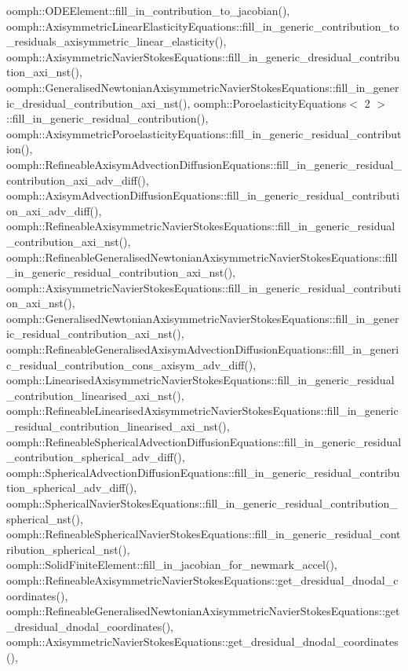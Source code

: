 oomph\+::\+O\+D\+E\+Element\+::fill\+\_\+in\+\_\+contribution\+\_\+to\+\_\+jacobian(), oomph\+::\+Axisymmetric\+Linear\+Elasticity\+Equations\+::fill\+\_\+in\+\_\+generic\+\_\+contribution\+\_\+to\+\_\+residuals\+\_\+axisymmetric\+\_\+linear\+\_\+elasticity(), oomph\+::\+Axisymmetric\+Navier\+Stokes\+Equations\+::fill\+\_\+in\+\_\+generic\+\_\+dresidual\+\_\+contribution\+\_\+axi\+\_\+nst(), oomph\+::\+Generalised\+Newtonian\+Axisymmetric\+Navier\+Stokes\+Equations\+::fill\+\_\+in\+\_\+generic\+\_\+dresidual\+\_\+contribution\+\_\+axi\+\_\+nst(), oomph\+::\+Poroelasticity\+Equations$<$ 2 $>$\+::fill\+\_\+in\+\_\+generic\+\_\+residual\+\_\+contribution(), oomph\+::\+Axisymmetric\+Poroelasticity\+Equations\+::fill\+\_\+in\+\_\+generic\+\_\+residual\+\_\+contribution(), oomph\+::\+Refineable\+Axisym\+Advection\+Diffusion\+Equations\+::fill\+\_\+in\+\_\+generic\+\_\+residual\+\_\+contribution\+\_\+axi\+\_\+adv\+\_\+diff(), oomph\+::\+Axisym\+Advection\+Diffusion\+Equations\+::fill\+\_\+in\+\_\+generic\+\_\+residual\+\_\+contribution\+\_\+axi\+\_\+adv\+\_\+diff(), oomph\+::\+Refineable\+Axisymmetric\+Navier\+Stokes\+Equations\+::fill\+\_\+in\+\_\+generic\+\_\+residual\+\_\+contribution\+\_\+axi\+\_\+nst(), oomph\+::\+Refineable\+Generalised\+Newtonian\+Axisymmetric\+Navier\+Stokes\+Equations\+::fill\+\_\+in\+\_\+generic\+\_\+residual\+\_\+contribution\+\_\+axi\+\_\+nst(), oomph\+::\+Axisymmetric\+Navier\+Stokes\+Equations\+::fill\+\_\+in\+\_\+generic\+\_\+residual\+\_\+contribution\+\_\+axi\+\_\+nst(), oomph\+::\+Generalised\+Newtonian\+Axisymmetric\+Navier\+Stokes\+Equations\+::fill\+\_\+in\+\_\+generic\+\_\+residual\+\_\+contribution\+\_\+axi\+\_\+nst(), oomph\+::\+Refineable\+Generalised\+Axisym\+Advection\+Diffusion\+Equations\+::fill\+\_\+in\+\_\+generic\+\_\+residual\+\_\+contribution\+\_\+cons\+\_\+axisym\+\_\+adv\+\_\+diff(), oomph\+::\+Linearised\+Axisymmetric\+Navier\+Stokes\+Equations\+::fill\+\_\+in\+\_\+generic\+\_\+residual\+\_\+contribution\+\_\+linearised\+\_\+axi\+\_\+nst(), oomph\+::\+Refineable\+Linearised\+Axisymmetric\+Navier\+Stokes\+Equations\+::fill\+\_\+in\+\_\+generic\+\_\+residual\+\_\+contribution\+\_\+linearised\+\_\+axi\+\_\+nst(), oomph\+::\+Refineable\+Spherical\+Advection\+Diffusion\+Equations\+::fill\+\_\+in\+\_\+generic\+\_\+residual\+\_\+contribution\+\_\+spherical\+\_\+adv\+\_\+diff(), oomph\+::\+Spherical\+Advection\+Diffusion\+Equations\+::fill\+\_\+in\+\_\+generic\+\_\+residual\+\_\+contribution\+\_\+spherical\+\_\+adv\+\_\+diff(), oomph\+::\+Spherical\+Navier\+Stokes\+Equations\+::fill\+\_\+in\+\_\+generic\+\_\+residual\+\_\+contribution\+\_\+spherical\+\_\+nst(), oomph\+::\+Refineable\+Spherical\+Navier\+Stokes\+Equations\+::fill\+\_\+in\+\_\+generic\+\_\+residual\+\_\+contribution\+\_\+spherical\+\_\+nst(), oomph\+::\+Solid\+Finite\+Element\+::fill\+\_\+in\+\_\+jacobian\+\_\+for\+\_\+newmark\+\_\+accel(), oomph\+::\+Refineable\+Axisymmetric\+Navier\+Stokes\+Equations\+::get\+\_\+dresidual\+\_\+dnodal\+\_\+coordinates(), oomph\+::\+Refineable\+Generalised\+Newtonian\+Axisymmetric\+Navier\+Stokes\+Equations\+::get\+\_\+dresidual\+\_\+dnodal\+\_\+coordinates(), oomph\+::\+Axisymmetric\+Navier\+Stokes\+Equations\+::get\+\_\+dresidual\+\_\+dnodal\+\_\+coordinates(), 